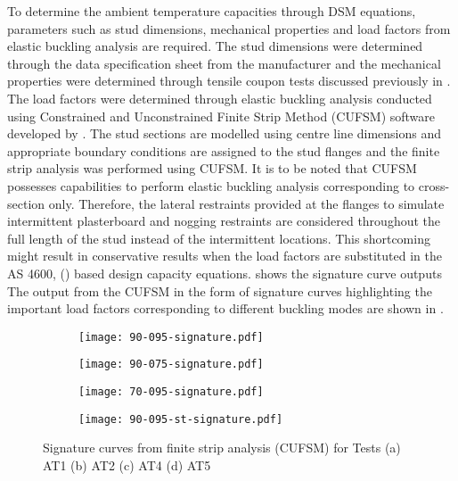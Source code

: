 To determine the ambient temperature capacities through DSM equations, parameters such as stud dimensions, mechanical properties and load factors from elastic buckling analysis are required. The stud dimensions were determined through the data specification sheet from the manufacturer and the mechanical properties were determined through tensile coupon tests discussed previously in . The load factors were determined through elastic buckling analysis conducted using Constrained and Unconstrained Finite Strip Method (CUFSM) software developed by \citet{Li2010a}. The stud sections are modelled using centre line dimensions and appropriate boundary conditions are assigned to the stud flanges and the finite strip analysis was performed using CUFSM. It is to be noted that CUFSM possesses capabilities to perform elastic buckling analysis corresponding to cross-section only. Therefore, the lateral restraints provided at the flanges to simulate intermittent plasterboard and nogging restraints are considered throughout the full length of the stud instead of the intermittent locations. This shortcoming might result in conservative results when the load factors are substituted in the AS 4600, (\cite{ASNZ4600}) based design capacity equations.  shows the signature curve outputs The output from the CUFSM in the form of signature curves highlighting the important load factors corresponding to different buckling modes are shown in .     
\begin{figure}
	\centering
	\begin{subfigure}[b]{0.6\textwidth}
		\centering
		\texttt{[image: 90-095-signature.pdf]}
		\caption{}
		\label{subfig:90-095-signature}
	\end{subfigure}
	\begin{subfigure}[b]{0.6\textwidth}
		\centering
		\texttt{[image: 90-075-signature.pdf]}
		\caption{}
		\label{subfig:90-075-signature}
	\end{subfigure}
	\begin{subfigure}[b]{0.6\textwidth}
		\centering
		\texttt{[image: 70-095-signature.pdf]}
		\caption{}
		\label{subfig:70-095-signature}
	\end{subfigure}
		\label{fig:signature-curve-a}
\end{figure}
\begin{figure}
	\ContinuedFloat
	\centering
	\begin{subfigure}[b]{0.6\textwidth}
		\centering
		\texttt{[image: 90-095-st-signature.pdf]}
		\caption{}
		\label{subfig:90-095-st-signature}
	\end{subfigure}
		\caption{Signature curves from finite strip analysis (CUFSM) for Tests (a) AT1 (b) AT2 (c) AT4 (d) AT5}
		\label{fig:signature-curve}
\end{figure}
